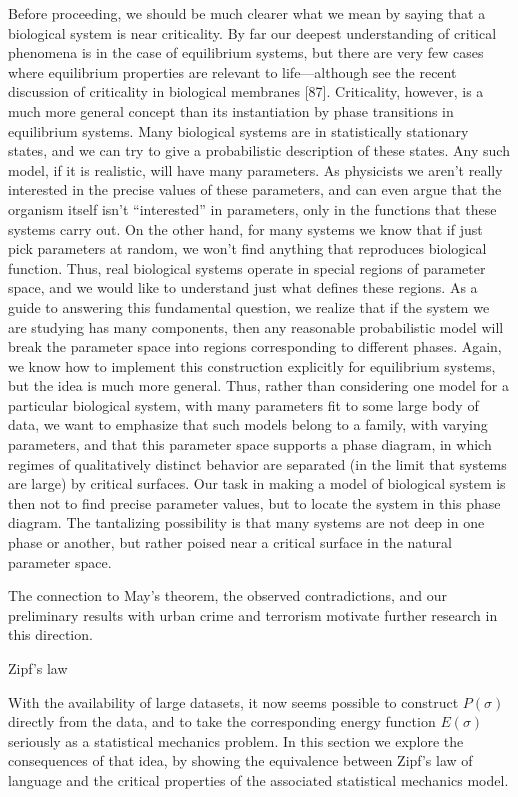 \documentclass[onecolumn, compsoc,11pt]{IEEEtran}
\begin{document}
Before proceeding, we should be much clearer what we mean by saying that a biological
system is near criticality. By far our deepest understanding of critical phenomena is in the case of equilibrium systems, but there are very few cases where equilibrium properties are relevant to life—although see the recent discussion of criticality in biological membranes [87]. Criticality, however, is a much more general concept than its instantiation by phase transitions in equilibrium systems. Many biological systems are in statistically stationary states, and we can try to give a probabilistic description of these states. Any such model, if it is realistic, will have many parameters. As physicists we aren’t really interested in the precise
values of these parameters, and can even argue that the organism itself isn’t “interested” in parameters, only in the functions that these systems carry out. On the other hand, for many systems we know that if just pick parameters at random, we won’t find anything that reproduces biological function. Thus, real biological systems operate in special regions of parameter space, and we would like to understand just what defines these regions. As a guide to answering this fundamental question, we realize that if the system we are studying has many components, then any reasonable probabilistic model will break the parameter space into regions corresponding to different phases. Again, we know how to implement
this construction explicitly for equilibrium systems, but the idea is much more general. Thus, rather than considering one model for a particular biological system, with many parameters fit to some large body of data, we want to emphasize that such models belong to a family, with varying parameters, and that this parameter space supports a phase diagram, in which regimes of qualitatively distinct behavior are separated (in the limit that systems are large) by critical surfaces. Our task in making a model of biological system is then not to find precise parameter values, but to locate the system in this phase diagram. The tantalizing possibility is that many systems are not deep in one phase or another, but rather poised near a critical surface in the natural parameter space.

The connection to May's theorem, the observed contradictions, and our preliminary results with urban crime and terrorism motivate further research in this direction.


Zipf's law

With the availability of large datasets, it now seems possible to construct $P (\sigma )$ directly
from the data, and to take the corresponding energy function $E(\sigma )$ seriously as a statistical
mechanics problem. In this section we explore the consequences of that idea, by showing
the equivalence between Zipf’s law of language and the critical properties of the associated
statistical mechanics model.
\end{document}
